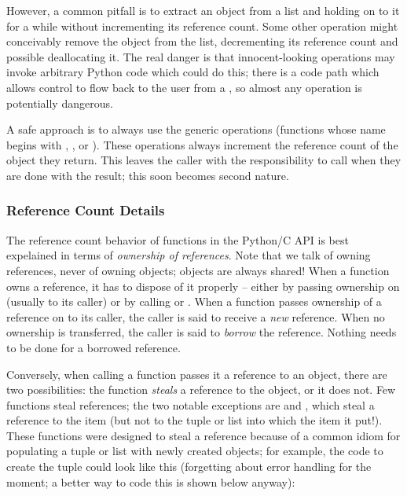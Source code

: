 \documentclass[twoside,openright]{report}
\begin{document}
However, a common pitfall is to extract an object from a list and 
holding on to it for a while without incrementing its reference count.  
Some other operation might conceivably remove the object from the 
list, decrementing its reference count and possible deallocating it.  
The real danger is that innocent-looking operations may invoke 
arbitrary Python code which could do this; there is a code path which 
allows control to flow back to the user from a , so 
almost any operation is potentially dangerous.

A safe approach is to always use the generic operations (functions 
whose name begins with , , 
 or ).  These operations always 
increment the reference count of the object they return.  This leaves 
the caller with the responsibility to call  when 
they are done with the result; this soon becomes second nature.

\subsubsection{Reference Count Details}

The reference count behavior of functions in the Python/C API is best 
expelained in terms of \emph{ownership of references}.  Note that we 
talk of owning references, never of owning objects; objects are always 
shared!  When a function owns a reference, it has to dispose of it 
properly -- either by passing ownership on (usually to its caller) or 
by calling  or .  When a function 
passes ownership of a reference on to its caller, the caller is said 
to receive a \emph{new} reference.  When no ownership is transferred, 
the caller is said to \emph{borrow} the reference.  Nothing needs to 
be done for a borrowed reference.

Conversely, when calling a function passes it a reference to an 
object, there are two possibilities: the function \emph{steals} a 
reference to the object, or it does not.  Few functions steal 
references; the two notable exceptions are  and 
, which steal a reference to the item (but not to 
the tuple or list into which the item it put!).  These functions were
designed to steal a reference because of a common idiom for populating
a tuple or list with newly created objects; for example, the code to
create the tuple  could look like this
(forgetting about error handling for the moment; a better way to code
this is shown below anyway):
\end{document}

